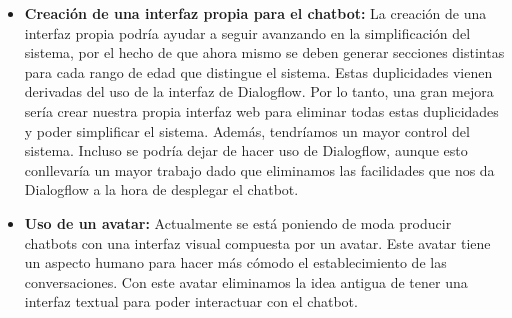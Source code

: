 \begin{itemize}
\item \textbf{Creación de una interfaz propia para el chatbot:} La creación de una interfaz propia podría ayudar a seguir avanzando en la simplificación del sistema, por el hecho de que ahora mismo se deben generar secciones distintas para cada rango de edad que distingue el sistema. Estas duplicidades vienen derivadas del uso de la interfaz de Dialogflow. Por lo tanto, una gran mejora sería crear nuestra propia interfaz web para eliminar todas estas duplicidades y poder simplificar el sistema. Además, tendríamos un mayor control del sistema. Incluso se podría dejar de hacer uso de Dialogflow, aunque esto conllevaría un mayor trabajo dado que eliminamos las facilidades que nos da Dialogflow a la hora de desplegar el chatbot.
\item \textbf{Uso de un avatar:} Actualmente se está poniendo de moda producir chatbots con una interfaz visual compuesta por un avatar. Este avatar tiene un aspecto humano para hacer más cómodo el establecimiento de las conversaciones. Con este avatar eliminamos la idea antigua de tener una interfaz textual para poder interactuar con el chatbot.
\end{itemize}

